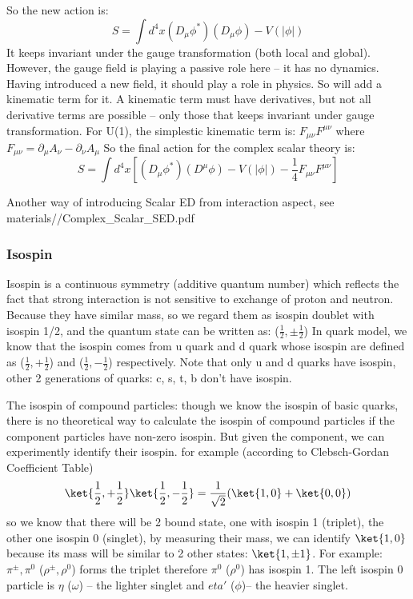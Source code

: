 So the new action is:
$$ S = \int d^4x(D_\mu\phi^*)(D_\mu\phi) - V(|\phi|) $$
It keeps invariant under the gauge transformation (both local and global).
However, the gauge field is playing a passive role here -- it has no dynamics.
Having introduced a new field, it should play a role in physics. So will add
a kinematic term for it. A kinematic term must have derivatives, but not all
derivative terms are possible -- only those that keeps invariant under gauge
transformation. For U(1), the simplestic kinematic term is: $F_{\mu\nu}F^{\mu\nu}$
where $F_{\mu\nu} = \partial_\mu A_\nu - \partial_\nu A_\mu$
So the final action for the complex scalar theory is:
$$ S = \int d^4x \left[(D_\mu\phi^*)(D^\mu\phi) - V(|\phi|) - \frac{1}{4}F_{\mu\nu}F^{\mu\nu}\right] $$

Another way of introducing Scalar ED from interaction aspect, see 
materials//Complex\_Scalar\_SED.pdf
\subsubsection{Isospin}
Isospin is a continuous symmetry (additive quantum number) which reflects the 
fact that strong interaction is not sensitive to exchange of proton and neutron.
Because they have similar mass, so we regard them as isospin doublet with 
isospin 1/2, and the quantum state can be written as: ($\frac{1}{2}, \pm\frac{1}{2}$)
In quark model, we know that the isospin comes from u quark and d quark whose 
isospin are defined as ($\frac{1}{2}, +\frac{1}{2}$) and 
($\frac{1}{2}, -\frac{1}{2}$) respectively. Note that only u and d quarks have 
isospin, other 2 generations of quarks: c, s, t, b don't have isospin. 

The isospin of compound particles: though we know the isospin of basic quarks,
there is no theoretical way to calculate the isospin of compound particles if
the component particles have non-zero isospin. But given the component, we can
experimently identify their isospin. for example (according to Clebsch-Gordan Coefficient Table)
$$ \ket{\frac{1}{2}, +\frac{1}{2}}\ket{\frac{1}{2}, -\frac{1}{2}} = 
    \frac{1}{\sqrt{2}}(\ket{1, 0} + \ket{0, 0})$$
so we know that there will be 2 bound state, one with isospin 1 (triplet), the 
other one isospin 0 (singlet), by measuring their mass, we can identify 
$\ket{1, 0}$ because its mass will be similar to 2 other states: $\ket{1, \pm1}$.
For example: $\pi^\pm, \pi^0$ ($\rho^\pm, \rho^0$) forms the triplet therefore 
$\pi^0$ ($\rho^0$) has isospin 1. The left isospin 0 particle is $\eta$ 
($\omega$) -- the lighter singlet and $eta'$ ($\phi$)-- the heavier singlet. 

